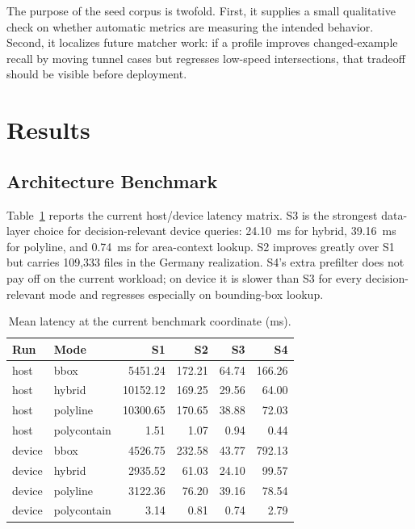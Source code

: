 \documentclass[sigconf]{acmart}
\begin{document}
The purpose of the seed corpus is twofold. First, it supplies a small qualitative check on whether automatic metrics are measuring the intended behavior. Second, it localizes future matcher work: if a profile improves changed-example recall by moving tunnel cases but regresses low-speed intersections, that tradeoff should be visible before deployment.

\section{Results}

\subsection{Architecture Benchmark}

Table~\ref{tab:latency} reports the current host/device latency matrix. S3 is the strongest data-layer choice for decision-relevant device queries: \SI{24.10}{ms} for hybrid, \SI{39.16}{ms} for polyline, and \SI{0.74}{ms} for area-context lookup. S2 improves greatly over S1 but carries 109,333 files in the Germany realization. S4's extra prefilter does not pay off on the current workload; on device it is slower than S3 for every decision-relevant mode and regresses especially on bounding-box lookup.

\begin{table}[t]
\caption{Mean latency at the current benchmark coordinate (\si{\milli\second}).}
\label{tab:latency}
\centering
\scriptsize
\begin{tabular}{llrrrr}
\toprule
Run & Mode & S1 & S2 & S3 & S4 \\
\midrule
host & bbox & 5451.24 & 172.21 & 64.74 & 166.26 \\
host & hybrid & 10152.12 & 169.25 & 29.56 & 64.00 \\
host & polyline & 10300.65 & 170.65 & 38.88 & 72.03 \\
host & polycontain & 1.51 & 1.07 & 0.94 & 0.44 \\
\midrule
device & bbox & 4526.75 & 232.58 & 43.77 & 792.13 \\
device & hybrid & 2935.52 & 61.03 & 24.10 & 99.57 \\
device & polyline & 3122.36 & 76.20 & 39.16 & 78.54 \\
device & polycontain & 3.14 & 0.81 & 0.74 & 2.79 \\
\bottomrule
\end{tabular}
\end{table}
\end{document}
